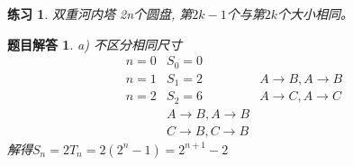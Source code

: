 \documentclass[mode=geye]{elegantnote}
\newtheorem{exercise}{练习}
\newtheorem{answer}{题目解答}
\begin{document}
\begin{exercise}
	双重河内塔 2n个圆盘, 第$ 2k-1 $个与第$ 2k $个大小相同。
\end{exercise}

\begin{answer}
	a) 不区分相同尺寸
	\begin{equation*}
		\begin{aligned}
			n=0 & S_0=0	& \\
			n=1 & S_1=2	& A \rightarrow B, A \rightarrow B\\
			n=2 & S_2=6	& A \rightarrow C, A \rightarrow C\\
						& A \rightarrow B, A \rightarrow B\\
						& C \rightarrow B, C \rightarrow B
		\end{aligned}
	\end{equation*}
	解得$ S_n = 2T_n = 2(2^n-1)=2^{n+1}-2 $
	

\end{answer}
\end{document}
